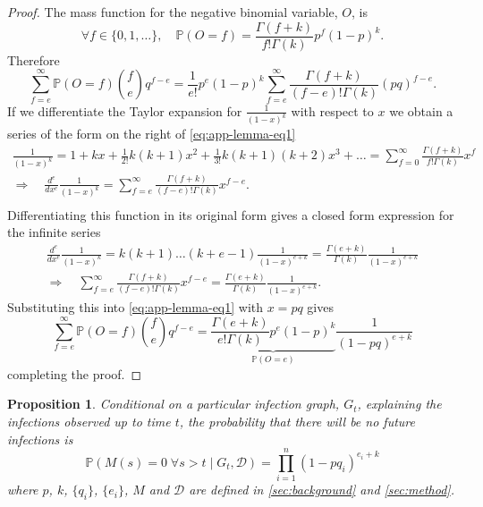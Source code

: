 \documentclass{article}
\newtheorem{proposition}{Proposition}[section]
\begin{document}
\begin{proof}
The mass function for the negative binomial variable, \(O\), is
\[
\forall f \in \{0, 1, \dots\}, \quad \mathbb{P}(O = f)
= \frac{\Gamma(f+k)}{f! \Gamma(k)} p^f (1-p)^k.
\]
Therefore
\begin{equation}\label{eq:app-lemma-eq1}
\sum_{f=e}^\infty \mathbb{P}(O = f) \binom{f}{e} q^{f-e}
= \frac{1}{e!}p^e (1-p)^k \sum_{f=e}^\infty \frac{\Gamma(f+k)}{(f-e)! \Gamma(k)} (pq)^{f-e}.
\end{equation}
If we differentiate the Taylor expansion for \(\frac{1}{(1-x)^k}\) with respect to \(x\) we obtain a series of the form on the right of \autoref{eq:app-lemma-eq1}
\begin{gather*}
    \frac{1}{(1-x)^k} = 1 + kx + \frac{1}{2!} k(k+1) x^2 + \frac{1}{3!} k(k+1)(k+2) x^3 + \dots = \sum_{f=0}^\infty \frac{\Gamma(f+k)}{f! \Gamma(k)} x^f \\
    \Rightarrow\quad \frac{d^e}{dx^e} \frac{1}{(1-x)^k} = \sum_{f=e}^\infty \frac{\Gamma(f+k)}{(f-e)!\Gamma(k)} x^{f-e}. \\
\end{gather*}
Differentiating this function in its original form gives a closed form expression for the infinite series
\begin{gather*}
    \frac{d^e}{dx^e} \frac{1}{(1-x)^k} = k(k+1)\dots(k+e-1) \frac{1}{(1-x)^{e+k}} = \frac{\Gamma(e+k)}{\Gamma(k)} \frac{1}{(1-x)^{e+k}} \\
    \Rightarrow\quad \sum_{f=e}^\infty \frac{\Gamma(f+k)}{(f-e)!\Gamma(k)} x^{f-e} = \frac{\Gamma(e+k)}{\Gamma(k)} \frac{1}{(1-x)^{e+k}}.
\end{gather*}
Substituting this into \autoref{eq:app-lemma-eq1} with \(x=pq\) gives
\[
\sum_{f=e}^\infty \mathbb{P}(O = f) \binom{f}{e} q^{f-e}
= \underbrace{\frac{\Gamma(e+k)}{e! \Gamma(k)} p^e (1-p)^k}_{\mathbb{P}(O = e)} \frac{1}{(1-pq)^{e+k}}
\]
completing the proof.

\end{proof}

\begin{proposition}\label{thm:conditional-eoo-prob}
Conditional on a particular infection graph, \(G_t\), explaining the infections observed up to time \(t\), the probability that there will be no future infections is
\[\mathbb{P}(M(s) = 0 \;\forall s > t \;|\; G_t, \mathcal{D}) = \prod_{i=1}^n (1-p q_i)^{e_i + k}\]
where \(p\), \(k\), \(\{q_i\}\), \(\{e_i\}\), \(M\) and \(\mathcal{D}\) are defined in \autoref{sec:background} and \autoref{sec:method}.
\end{proposition}
\end{document}
